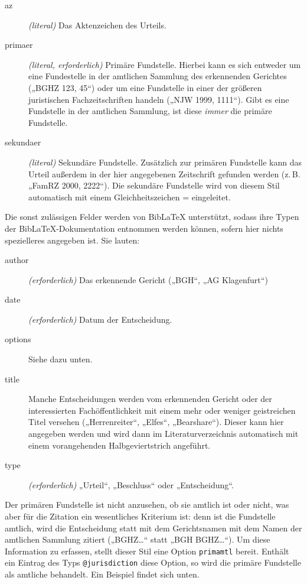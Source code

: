 \documentclass[11pt,a4paper,DIV=calc]{scrartcl}
\newcommand\software[1]{\textsf{#1}}
\newcommand\Biblatex{\software{Bib\LaTeX{}}\xspace}
\newcommand\zB{z.\,B.\xspace}
\begin{document}
\begin{description}
\item[az] \emph{(literal)} Das Aktenzeichen des Urteils.
\item[primaer] \emph{(literal, erforderlich)} Primäre
  Fundstelle. Hierbei kann es sich entweder um eine Fundestelle in der
  amtlichen Sammlung des erkennenden Gerichtes („BGHZ 123, 45“) oder
  um eine Fundstelle in einer der größeren juristischen
  Fachzeitschriften handeln („NJW 1999, 1111“). Gibt es eine
  Fundstelle in der amtlichen Sammlung, ist diese \emph{immer} die
  primäre Fundstelle.
\item[sekundaer] \emph{(literal)} Sekundäre Fundstelle. Zusätzlich zur
  primären Fundstelle kann das Urteil außerdem in der hier angegebenen
  Zeitschrift gefunden werden (\zB „FamRZ 2000, 2222“). Die sekundäre
  Fundstelle wird von diesem Stil automatisch mit einem
  Gleichheitszeichen = eingeleitet.
\end{description}

Die sonst zulässigen Felder werden von \Biblatex unterstützt, sodass
ihre Typen der \Biblatex-Do\-ku\-men\-ta\-tion entnommen werden können, sofern
hier nichts spezielleres angegeben ist. Sie lauten:

\begin{description}
\item[author] \emph{(erforderlich)} Das erkennende Gericht („BGH“, „AG Klagenfurt“)
\item[date] \emph{(erforderlich)} Datum der Entscheidung.
\item[options] Siehe dazu unten.
\item[title] Manche Entscheidungen werden vom erkennenden Gericht oder
  der interessierten Fachöffentlichkeit mit einem mehr oder weniger
  geistreichen Titel versehen („Herrenreiter“, „Elfes“,
  „Bearshare“). Dieser kann hier angegeben werden und wird dann im
  Literaturverzeichnis automatisch mit einem
  vorangehenden Halbgeviertstrich angeführt.
\item[type] \emph{(erforderlich)} „Urteil“, „Beschluss“ oder
  „Entscheidung“.
\end{description}

Der primären Fundstelle ist nicht anzusehen, ob sie amtlich ist oder
nicht, was aber für die Zitation ein wesentliches Kriterium ist: denn
ist die Fundstelle amtlich, wird die Entscheidung statt mit dem
Gerichtsnamen mit dem Namen der amtlichen Sammlung zitiert („BGHZ\ldots“
statt „BGH BGHZ\ldots“). Um diese Information zu erfassen, stellt
dieser Stil eine Option \verb+primamtl+ bereit. Enthält ein Eintrag
des Typs \verb+@jurisdiction+ diese Option, so wird die primäre
Fundstelle als amtliche behandelt. Ein Beispiel findet sich unten.
\end{document}
